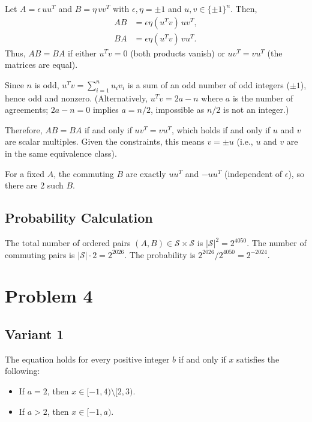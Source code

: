 \documentclass[12pt,a4paper]{article}
\theoremstyle{definition}
\begin{document}
    Let $A = \epsilon \, u u^T$ and $B = \eta \, v v^T$ with $\epsilon, \eta = \pm 1$ and $u, v \in \{\pm 1\}^n$. Then,
    \begin{align}
        AB &= \epsilon \eta (u^T v) \, u v^T, \\
        BA &= \epsilon \eta (u^T v) \, v u^T.
    \end{align}
    Thus, $AB = BA$ if either $u^T v = 0$ (both products vanish) or $u v^T = v u^T$ (the matrices are equal).

    Since $n$ is odd, $u^T v = \sum_{i=1}^n u_i v_i$ is a sum of an odd number of odd integers ($\pm 1$), hence odd and nonzero. (Alternatively, $u^T v = 2a - n$ where $a$ is the number of agreements; $2a - n = 0$ implies $a = n/2$, impossible as $n/2$ is not an integer.)

    Therefore, $AB = BA$ if and only if $u v^T = v u^T$, which holds if and only if $u$ and $v$ are scalar multiples. Given the constraints, this means $v = \pm u$ (i.e., $u$ and $v$ are in the same equivalence class).

    For a fixed $A$, the commuting $B$ are exactly $u u^T$ and $-u u^T$ (independent of $\epsilon$), so there are 2 such $B$.

    \subsection*{Probability Calculation}

    The total number of ordered pairs $(A, B) \in \mathcal{S} \times \mathcal{S}$ is $|\mathcal{S}|^2 = 2^{4050}$. The number of commuting pairs is $|\mathcal{S}| \cdot 2 = 2^{2026}$. The probability is $2^{2026} / 2^{4050} = 2^{-2024}$.


  \section{Problem 4}
\subsection{Variant 1}
    The equation holds for every positive integer $b$ if and only if $x$ satisfies the following:

    \begin{itemize}
        \item If $a = 2$, then $x \in [-1, 4) \setminus [2, 3)$.
        \item If $a > 2$, then $x \in [-1, a)$.
    \end{itemize}
\end{document}
